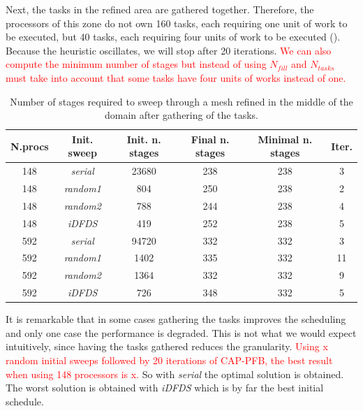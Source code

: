 \documentclass[letterpaper]{article}
\newcommand\red{\textcolor{red}}
\renewcommand{\(}{\left(}
\renewcommand{\)}{\right)}
\renewcommand{\[}{\left[}
\renewcommand{\]}{\right]}
\begin{document}
Next, the tasks in the refined area are gathered together. Therefore, the
processors of this zone do not own 160 tasks, each requiring one unit of work to
be executed, but 40 tasks, each requiring four units of work to be executed
(). Because the heuristic oscillates, we will stop after 20
iterations. \red{We can also compute the
minimum number of stages but instead of using $N_{fill}$ and $N_{tasks}$ must
take into account that some tasks have four units of works instead of one.}
\begin{table}[H]
  \begin{center}
    \begin{tabular}{|c|c|c|c|c|c|}
      \hline
      N.procs & Init. sweep & Init. n. stages & Final n. stages & Minimal n. stages & Iter. \\
      \hline
      148 &  \emph{serial} & 23680 & 238 & 238 &  3 \\
      148 & \emph{random1} &   804 & 250 & 238 &  2 \\
      148 & \emph{random2} &   788 & 244 & 238 &  4 \\
      148 &   \emph{iDFDS} &   419 & 252 & 238 &  5 \\
      592 &  \emph{serial} & 94720 & 332 & 332 &  3 \\
      592 & \emph{random1} &  1402 & 335 & 332 & 11 \\
      592 & \emph{random2} &  1364 & 332 & 332 &  9 \\
      592 &   \emph{iDFDS} &   726 & 348 & 332 &  5 \\
      \hline
    \end{tabular}
    \caption{Number of stages required to sweep through a mesh refined in the
      middle of the domain after gathering of the tasks.}
    \label{amr_2}
  \end{center}
\end{table}

It is remarkable that in some cases gathering the tasks improves the scheduling
and only one case the performance is degraded. This is not what we would expect
intuitively, since having the tasks gathered reduces the granularity.
\red{Using x random initial sweeps followed by 20 iterations of
CAP-PFB, the best result when using 148 processors is x.} So with \emph{serial}
the optimal solution is obtained. The worst solution is obtained with
\emph{iDFDS} which is by far the best initial schedule.
\end{document}
